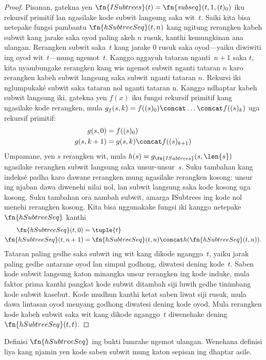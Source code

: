 \documentclass[../../../include/open-logic-section]{subfiles}
\begin{document}
\begin{proof}
  Pisanan, gatekna yen $\fn{ISubtrees}(t) =
  \fn{subseq}(t, 1, (t)_0)$ iku rekursif primitif
  lan ngasilake kode subwit langsung saka wit~$t$.
  Saiki kita bisa netepake fungsi pambantu
  $\fn{hSubtreeSeq}(t,n)$ kang ngitung rerangken
  kabeh subwit kang jarake saka oyod paling akeh
  $n$ rusuk, kanthi kemungkinan ana ulangan.
  Rerangken subwit saka~$t$ kang jarake $0$
  rusuk saka oyod---yaiku diwiwiti ing oyod
  wit~$t$---mung ngemot~$t$.
  Kanggo nggayuh tataran nganti~$n+1$ saka $t$, kita
  nyambungake rerangken kang wis ngemot subwit
  nganti tataran $n$ karo rerangken kabeh subwit
  langsung saka subwit nganti tataran $n$.
  Rekursi iki nglumpukaké subwit saka tataran nol nganti tataran n.
  Kanggo ndhaptar kabeh subwit langsung iki, gatekna
  yen $f(x)$ iku fungsi rekursif primitif kang
  ngasilake kode rerangken, mula $g_f(s, k) = f((s)_0) \concat
  \dots \concat f((s)_k)$ uga rekursif primitif:
    \begin{align*}
      g(s, 0) & = f((s)_0)\\
      g(s, k+1) & = g(s, k) \concat f((s)_{k+1})
    \end{align*}
    Umpamane, yen $s$ rerangken wit, mula
    $h(s) = g_{\fn{ISubtrees}}(s, \len{s})$
    ngasilake rerangken subwit langsung saka
    unsur-unsur~$s$. Suku tambahan kang indeksé
    padha karo dawane rerangken mung ngasilake
    rerangken kosong: unsur ing njaban dawa
    diwenehi nilai nol, lan subwit langsung saka
    kode kosong uga kosong.
    Suku tambahan ora nambah subwit, amarga ISubtrees ing kode nol menehi rerangken kosong.
    Kita bisa nggunakake fungsi iki kanggo netepake
    $\fn{hSubtreeSeq}$ kanthi
    \begin{align*}
      \fn{hSubtreeSeq}(t, 0) & = \tuple{t} \\
      \fn{hSubtreeSeq}(t, n+1) & = \fn{hSubtreeSeq}(t, n) \concat
      h(\fn{hSubtreeSeq}(t, n)).
    \end{align*}
    Tataran paling gedhe saka subwit ing wit kang
    dikode nganggo~$t$, yaiku jarak paling gedhe
    antarane oyod lan simpul godhong, diwatesi
    dening kode~$t$. Saben kode subwit langsung katon minangka unsur rerangken ing kode induke, mula faktor prima kanthi pangkat kode subwit ditambah siji luwih gedhe tinimbang kode subwit kasebut. Kode mudhun kanthi ketat saben liwat siji rusuk, mula dawa lintasan oyod menyang godhong diwatesi dening kode oyod.
    Mula rerangken kode kabeh
    subwit saka wit kang dikode nganggo~$t$
    diwenehake dening $\fn{hSubtreeSeq}(t, t)$.
\end{proof}

\begin{prob}
  Definisi $\fn{hSubtreeSeq}$ ing bukti
   lumrahe
  ngemot ulangan. Wenehana definisi liya kang
  njamin yen kode saben subwit mung katon sepisan
  ing dhaptar asile.
\end{prob}
\end{document}

